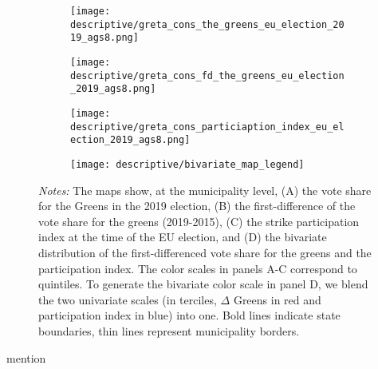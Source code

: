 \begin{figure}[H]\centering
	\caption{Spatial correlation of the vote share of the Greens and strike participation}
	\label{fig_greta_cons:spatial_correlation_greens_index}
	\begin{subfigure}[h]{0.45\linewidth}\centering
		\texttt{[image: descriptive/greta\_cons\_the\_greens\_eu\_election\_2019\_ags8.png]}
	\end{subfigure}
	\begin{subfigure}[h]{0.45\linewidth}\centering
		\texttt{[image: descriptive/greta\_cons\_fd\_the\_greens\_eu\_election\_2019\_ags8.png]}
	\end{subfigure}
	\begin{subfigure}[h]{0.45\linewidth}\centering
		\texttt{[image: descriptive/greta\_cons\_particiaption\_index\_eu\_election\_2019\_ags8.png]}
	\end{subfigure}
	\begin{subfigure}[h]{0.47\linewidth}\centering
		\texttt{[image: descriptive/bivariate\_map\_legend]}
	\end{subfigure}

	\begin{minipage}{0.9\linewidth}
		\scriptsize{\emph{Notes:} The maps show, at the municipality level, (A) the vote share for the Greens in the 2019 election, (B) the first-difference of the vote share for the greens (2019-2015), (C) the strike participation index at the time of the EU election, and (D) the bivariate distribution of the first-differenced vote share for the greens and the participation index. The color scales in panels A-C correspond to quintiles. To generate the bivariate color scale in panel D, we blend the two univariate scales (in terciles, $\Delta$ Greens in red and participation index in blue) into one. Bold lines indicate state boundaries, thin lines represent municipality borders.}
	\end{minipage}
\end{figure}


mention \cite{cantoni2020persistence}


